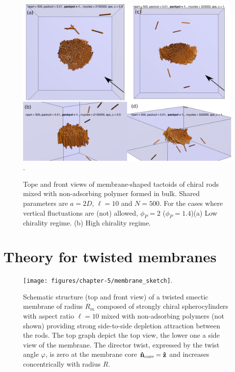 \begin{figure}
\begin{center}
\includegraphics[width= .8\columnwidth]{figures/chapter-5/samples}.
	\caption{Tope and front views of membrane-shaped tactoids of chiral rods mixed with non-adsorbing polymer formed in bulk. Shared parameters are $a = 2D$, $\ell = 10$ and $N = 500$. For the cases where vertical fluctuations are (not) allowed, $\phi_P=2$ ($\phi_P=1.4$)(a) Low chirality regime. (b) High chirality regime.}
\end{center}
\end{figure}






\section{Theory for twisted membranes}




\begin{figure}
\texttt{[image: figures/chapter-5/membrane\_sketch]}.
\caption{ \label{memsnap} Schematic structure (top and front view) of a twisted smectic membrane of radius $R_{m}$ composed of strongly chiral spherocylinders with aspect ratio $\ell = 10$ mixed with non-adsorbing polymers (not shown) providing strong side-to-side depletion attraction between the rods.  The top graph depict the top view, the lower one a side view of the membrane. The director twist, expressed by the twist angle $\varphi$, is zero at  the membrane  core ${\bf \hat{n}} _{\rm core} = {\bf \hat{z}}$ and increases concentrically with radius $R$.}
\end{figure}




